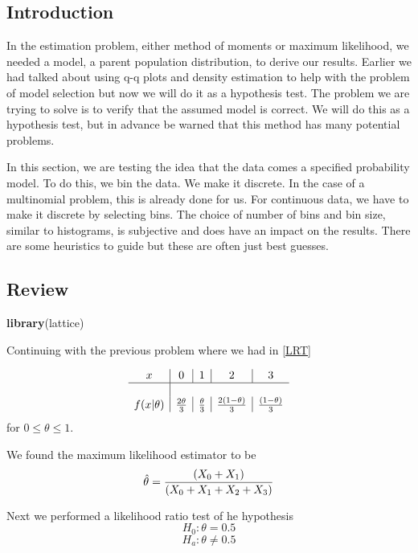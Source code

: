\documentclass[]{book}
\newenvironment{Shaded}{\begin{snugshade}}{\end{snugshade}}
\newcommand{\KeywordTok}[1]{\textcolor[rgb]{0.13,0.29,0.53}{\textbf{#1}}}
\newcommand{\NormalTok}[1]{#1}
\theoremstyle{definition}
\theoremstyle{definition}
\theoremstyle{definition}
\theoremstyle{remark}
\begin{document}
\subsection{Introduction}\label{introduction-5}

In the estimation problem, either method of moments or maximum
likelihood, we needed a model, a parent population distribution, to
derive our results. Earlier we had talked about using q-q plots and
density estimation to help with the problem of model selection but now
we will do it as a hypothesis test. The problem we are trying to solve
is to verify that the assumed model is correct. We will do this as a
hypothesis test, but in advance be warned that this method has many
potential problems.

In this section, we are testing the idea that the data comes a specified
probability model. To do this, we bin the data. We make it discrete. In
the case of a multinomial problem, this is already done for us. For
continuous data, we have to make it discrete by selecting bins. The
choice of number of bins and bin size, similar to histograms, is
subjective and does have an impact on the results. There are some
heuristics to guide but these are often just best guesses.

\subsection{Review}\label{review-6}

\begin{Shaded}
\begin{Highlighting}[]
\KeywordTok{library}\NormalTok{(lattice)}
\end{Highlighting}
\end{Shaded}

Continuing with the previous problem where we had in \ref{LRT}

\[
\begin{array}{c|c|c|c|c} 
x & 0 & 1 & 2 & 3 \\ \hline \\ f(x|\theta) & {2 \theta \over 3} & {\theta \over 3} & {2 (1 - \theta) \over 3} & {(1- \theta) \over 3}
\end{array} 
\] for \(0 \leq \theta \leq 1\).

We found the maximum likelihood estimator to be
\[\hat{\theta}={ (X_{0}+X_{1}) \over (X_{0}+X_{1}+X_{2}+X_{3}) }\]

Next we performed a likelihood ratio test of he hypothesis
\[H_{0}: \theta = 0.5\] \[H_{a}: \theta \neq 0.5\]
\end{document}

